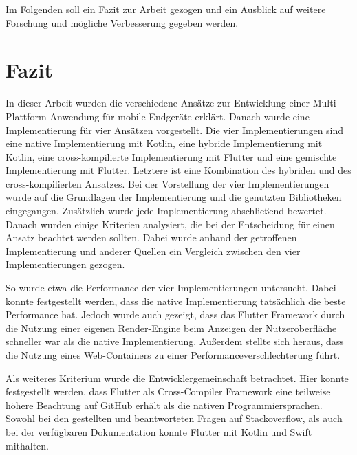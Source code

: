 Im Folgenden soll ein Fazit zur Arbeit gezogen und ein Ausblick auf weitere Forschung und mögliche Verbesserung gegeben werden.

\section{Fazit}
In dieser Arbeit wurden die verschiedene Ansätze zur Entwicklung einer Multi-Plattform Anwendung für mobile Endgeräte erklärt. Danach wurde eine Implementierung für vier Ansätzen vorgestellt. Die vier Implementierungen sind eine native Implementierung mit Kotlin, eine hybride Implementierung mit Kotlin, eine cross-kompilierte Implementierung mit Flutter und eine gemischte Implementierung mit Flutter. Letztere ist eine Kombination des hybriden und des cross-kompilierten Ansatzes. Bei der Vorstellung der vier Implementierungen wurde auf die Grundlagen der Implementierung und die genutzten Bibliotheken eingegangen. Zusätzlich wurde jede Implementierung abschließend bewertet. Danach wurden einige Kriterien analysiert, die bei der Entscheidung für einen Ansatz beachtet werden sollten. Dabei wurde anhand der getroffenen Implementierung und anderer Quellen ein Vergleich zwischen den vier Implementierungen gezogen.

So wurde etwa die Performance der vier Implementierungen untersucht. Dabei konnte festgestellt werden, dass die native Implementierung tatsächlich die beste Performance hat. Jedoch wurde auch gezeigt, dass das Flutter Framework durch die Nutzung einer eigenen Render-Engine beim Anzeigen der Nutzeroberfläche schneller war als die native Implementierung. Außerdem stellte sich heraus, dass die Nutzung eines Web-Containers zu einer Performanceverschlechterung führt. 


Als weiteres Kriterium wurde die Entwicklergemeinschaft betrachtet.
Hier konnte festgestellt werden, dass Flutter als Cross-Compiler Framework eine teilweise höhere Beachtung auf GitHub erhält als die nativen Programmiersprachen. 
Sowohl bei den gestellten und beantworteten Fragen auf Stackoverflow, als auch bei der verfügbaren Dokumentation konnte Flutter mit Kotlin und Swift mithalten.

